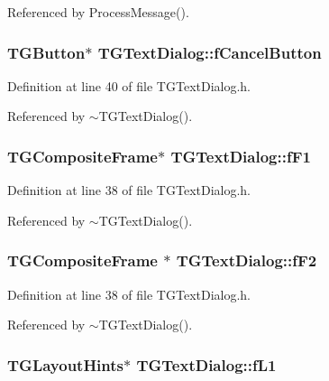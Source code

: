Referenced by ProcessMessage().

\subsubsection[{fCancelButton}]{\setlength{\rightskip}{0pt plus 5cm}TGButton$\ast$ {\bf TGTextDialog::fCancelButton}\hspace{0.3cm}{\ttfamily  [protected]}}\label{classTGTextDialog_a02c754484583115ea33e2f5d97af3640}


Definition at line 40 of file TGTextDialog.h.



Referenced by $\sim$TGTextDialog().

\subsubsection[{fF1}]{\setlength{\rightskip}{0pt plus 5cm}TGCompositeFrame$\ast$ {\bf TGTextDialog::fF1}\hspace{0.3cm}{\ttfamily  [protected]}}\label{classTGTextDialog_a27e4ebcf1556be894db3042f9557efc1}


Definition at line 38 of file TGTextDialog.h.



Referenced by $\sim$TGTextDialog().

\subsubsection[{fF2}]{\setlength{\rightskip}{0pt plus 5cm}TGCompositeFrame $\ast$ {\bf TGTextDialog::fF2}\hspace{0.3cm}{\ttfamily  [protected]}}\label{classTGTextDialog_a0fce6ff03f2f8b7862812821e6b22359}


Definition at line 38 of file TGTextDialog.h.



Referenced by $\sim$TGTextDialog().

\subsubsection[{fL1}]{\setlength{\rightskip}{0pt plus 5cm}TGLayoutHints$\ast$ {\bf TGTextDialog::fL1}\hspace{0.3cm}{\ttfamily  [protected]}}\label{classTGTextDialog_a6f42d7eb4f88d57988289e4b524c80af}


